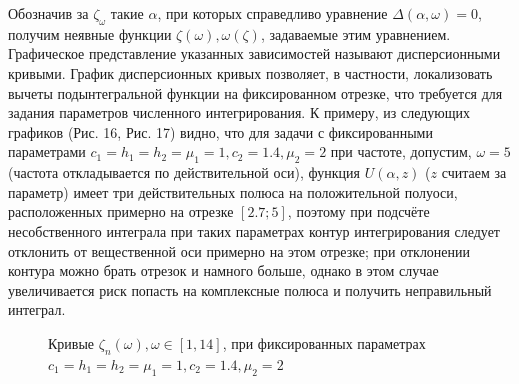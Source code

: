 \documentclass[a4paper, 12pt]{article}
\begin{document}
Обозначив за $\zeta_\omega$ такие $\alpha$, при которых справедливо уравнение $\Delta(\alpha,\omega)=0$, получим неявные функции $\zeta(\omega), \omega(\zeta)$, задаваемые этим уравнением. Графическое представление указанных зависимостей называют дисперсионными кривыми. График дисперсионных кривых позволяет, в частности, локализовать вычеты подынтегральной функции на фиксированном отрезке, что требуется для задания параметров численного интегрирования.
К примеру, из следующих графиков (Рис. 16, Рис. 17) видно, что для задачи с фиксированными параметрами $c_1=h_1=h_2=\mu_1=1, c_2=1.4, \mu_2=2$ при частоте, допустим, $\omega=5$ (частота откладывается по действительной оси), функция $U(\alpha,z)$ ($z$ считаем за параметр) имеет три действительных полюса на положительной полуоси, расположенных примерно на отрезке  $[2.7;5]$, поэтому при подсчёте несобственного интеграла при таких параметрах контур интегрирования следует отклонить от вещественной оси примерно на этом отрезке; при отклонении контура можно брать отрезок и намного больше, однако в этом случае увеличивается риск попасть на комплексные полюса и получить неправильный интеграл.

\begin{figure}[h!]
\noindent{}
\caption{Кривые $\zeta_n(\omega), \omega \in [1,14]$, при фиксированных параметрах $c_1=h_1=h_2=\mu_1=1,c_2=1.4,\mu_2=2$}
\label{figCurves}
\end{figure}
\end{document}
